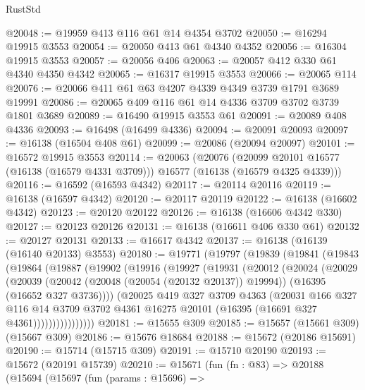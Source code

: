 \begin{lexlean}{RustStd}
\begin{coremodule}
@20048 := @19959 @413 @116 @61 @14 @4354 @3702
@20050 := @16294 @19915 @3553
@20054 := @20050 @413 @61 @4340 @4352
@20056 := @16304 @19915 @3553
@20057 := @20056 @406
@20063 := @20057 @412 @330 @61 @4340 @4350 @4342
@20065 := @16317 @19915 @3553
@20066 := @20065 @114
@20076 := @20066 @411 @61 @63 @4207 @4339 @4349 @3739 @1791 @3689 @19991
@20086 := @20065 @409 @116 @61 @14 @4336 @3709 @3702 @3739 @1801 @3689
@20089 := @16490 @19915 @3553 @61
@20091 := @20089 @408 @4336
@20093 := @16498 (@16499 @4336)
@20094 := @20091 @20093
@20097 := @16138 (@16504 @408 @61)
@20099 := @20086 (@20094 @20097)
@20101 := @16572 @19915 @3553
@20114 := @20063
    (@20076
      (@20099 @20101 @16577 (@16138 (@16579 @4331 @3709)))
      @16577
      (@16138 (@16579 @4325 @4339)))
@20116 := @16592 (@16593 @4342)
@20117 := @20114 @20116
@20119 := @16138 (@16597 @4342)
@20120 := @20117 @20119
@20122 := @16138 (@16602 @4342)
@20123 := @20120 @20122
@20126 := @16138 (@16606 @4342 @330)
@20127 := @20123 @20126
@20131 := @16138 (@16611 @406 @330 @61)
@20132 := @20127 @20131
@20133 := @16617 @4342
@20137 := @16138 (@16139 (@16140 @20133) @3553)
@20180 := @19771
    (@19797
      (@19839
        (@19841
          (@19843
            (@19864
              (@19887
                (@19902
                  (@19916
                    (@19927
                      (@19931
                        (@20012
                          (@20024
                            (@20029
                              (@20039
                                (@20042 (@20048 (@20054 (@20132 @20137)) @19994))
                                (@16395 (@16652 @327 @3736))))
                            (@20025
                              @419
                              @327
                              @3709
                              @4363
                              (@20031
                                @166
                                @327
                                @116
                                @14
                                @3709
                                @3702
                                @4361
                                @16275
                                @20101
                                (@16395 (@16691 @327 @4361))))))))))))))))
@20181 := @15655 @309
@20185 := @15657 (@15661 @309) (@15667 @309)
@20186 := @15676 @18684
@20188 := @15672 (@20186 @15691)
@20190 := @15714 (@15715 @309)
@20191 := @15710 @20190
@20193 := @15672 (@20191 @15739)
@20210 := @15671
    (fun (fn : @83) =>
    @20188
      (@15694
        (@15697
          (fun (params : @15696) =>

\end{coremodule}
\end{lexlean}
